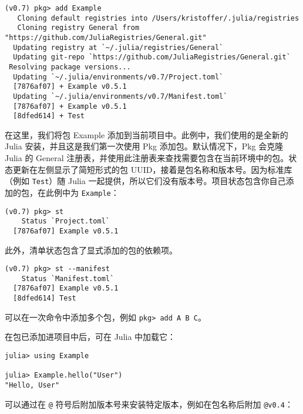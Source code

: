\begin{lstlisting}
(v0.7) pkg> add Example
   Cloning default registries into /Users/kristoffer/.julia/registries
   Cloning registry General from "https://github.com/JuliaRegistries/General.git"
  Updating registry at `~/.julia/registries/General`
  Updating git-repo `https://github.com/JuliaRegistries/General.git`
 Resolving package versions...
  Updating `~/.julia/environments/v0.7/Project.toml`
  [7876af07] + Example v0.5.1
  Updating `~/.julia/environments/v0.7/Manifest.toml`
  [7876af07] + Example v0.5.1
  [8dfed614] + Test
\end{lstlisting}



在这里，我们将包 Example 添加到当前项目中。此例中，我们使用的是全新的 Julia 安装，并且这是我们第一次使用 Pkg 添加包。默认情况下，Pkg 会克隆 Julia 的 General 注册表，并使用此注册表来查找需要包含在当前环境中的包。状态更新在左侧显示了简短形式的包 UUID，接着是包名称和版本号。因为标准库（例如 \texttt{Test}）随 Julia 一起提供，所以它们没有版本号。项目状态包含你自己添加的包，在此例中为 \texttt{Example}：




\begin{lstlisting}
(v0.7) pkg> st
    Status `Project.toml`
  [7876af07] Example v0.5.1
\end{lstlisting}



此外，清单状态包含了显式添加的包的依赖项。




\begin{lstlisting}
(v0.7) pkg> st --manifest
    Status `Manifest.toml`
  [7876af07] Example v0.5.1
  [8dfed614] Test
\end{lstlisting}



可以在一次命令中添加多个包，例如 \texttt{pkg> add A B C}。



在包已添加进项目中后，可在 Julia 中加载它：




\begin{lstlisting}
julia> using Example

julia> Example.hello("User")
"Hello, User"
\end{lstlisting}



可以通过在 \texttt{@} 符号后附加版本号来安装特定版本，例如在包名称后附加 \texttt{@v0.4}：




